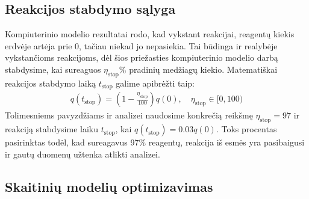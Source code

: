 \subsection{Reakcijos stabdymo sąlyga}
Kompiuterinio modelio rezultatai rodo, kad vykstant reakcijai, reagentų kiekis erdvėje artėja prie 0, tačiau niekad jo nepasiekia. Tai būdinga ir realybėje vykstančioms reakcijoms, dėl šios priežasties kompiuterinio modelio darbą stabdysime, kai sureaguos $\eta_\text{stop}\%$ pradinių medžiagų kiekio. Matematiškai reakcijos stabdymo laiką $t_\text{stop}$ galime apibrėžti taip:
\begin{align}
  q(t_\text{stop})=\left(1-\frac{\eta_\text{stop}}{100}\right)q(0),\quad \eta_\text{stop}\in[0, 100)
\end{align}
Tolimesniems pavyzdžiams ir analizei naudosime konkrečią reikšmę $\eta_\text{stop}=97$ ir reakciją stabdysime laiku $t_\text{stop}$, kai $q(t_\text{stop})=0.03q(0)$. Toks procentas pasirinktas todėl, kad sureagavus 97\% reagentų, reakcija iš esmės yra pasibaigusi ir gautų duomenų užtenka atlikti analizei.
\subsection{Skaitinių modelių optimizavimas}

